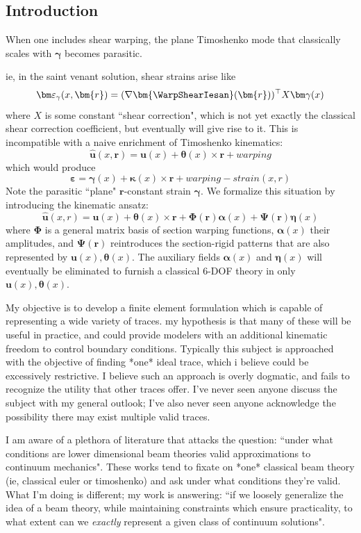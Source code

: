\subsection{Introduction}

\begin{Aside}

When one includes shear warping, the plane Timoshenko mode that classically scales with $\bm\gamma$ becomes parasitic. 

ie, in the saint venant solution, shear strains arise like 
$$
\bm\varepsilon_{\gamma}(x,\bm{r}) = (\nabla\bm{\WarpShearIesan}(\bm{r}))^{\top} X \bm\gamma(x)
$$ 
where $X$ is some constant ``shear correction", which is not yet exactly the classical shear correction coefficient, but eventually will give rise to it. 
This is incompatible with a naive enrichment of Timoshenko kinematics: 
$$\hat{\bm u}(x,\bm{r}) = \bm{u}(x) + \bm{\theta}(x)\times \bm{r} + warping$$
which would produce 
$$
\bm\varepsilon = \bm\gamma(x) + \bm\kappa(x)\times \bm{r} + warping-strain(x,r)
$$
Note the parasitic ``plane" $\bm{r}$-constant strain $\bm\gamma$. 
We formalize this situation by introducing the kinematic ansatz:
$$
\hat{\bm u}(x,r) = \bm u(x) + \bm\theta(x)\times \bm{r} 
+ \bm\Phi(\bm{r})\bm\alpha(x) + \bm\Psi(\bm{r})\bm\eta(x)
$$
where $\bm\Phi$ is a general matrix basis of section warping functions, $\bm\alpha(x)$ their amplitudes, and $\bm\Psi(\bm{r})$ reintroduces the section-rigid patterns that are also represented by $\bm{u}(x),\bm\theta(x)$. 
The auxiliary fields $\bm\alpha(x)$ and $\bm\eta(x)$ will eventually be eliminated to furnish a classical 6-DOF theory in only $\bm{u}(x),\bm\theta(x)$. 
\end{Aside}

\begin{Prompt}
My objective is to develop a finite element formulation which is capable of representing a wide variety of traces. my hypothesis is that many of these will be useful in practice, and could provide modelers with an additional kinematic freedom to control  boundary conditions. Typically this subject is approached with the objective of finding *one* ideal trace, which i believe could be excessively restrictive. 
I believe such an approach is overly dogmatic, and fails to recognize the utility that other traces offer. 
I've never seen anyone discuss the subject with my general outlook; I've also never seen anyone acknowledge the possibility there may exist multiple valid traces. 

I am aware of a plethora of literature that attacks the question: ``under what conditions are lower dimensional beam theories valid approximations to continuum mechanics". These works tend to fixate on *one* classical beam theory (ie, classical euler or timoshenko) and ask under what conditions they're valid. 
What I'm doing is different; my work is answering: ``if we loosely generalize the idea of a beam theory, while maintaining constraints which ensure practicality, to what extent can we \emph{exactly} represent a given class of continuum solutions".
\end{Prompt}


